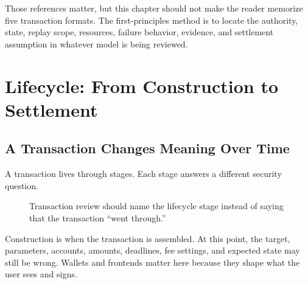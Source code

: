 Those references matter, but this chapter should not make the reader memorize five transaction formats. The first-principles method is to locate the authority, state, replay scope, resources, failure behavior, evidence, and settlement assumption in whatever model is being reviewed.

\section{Lifecycle: From Construction to Settlement}

\subsection{A Transaction Changes Meaning Over Time}

A transaction lives through stages. Each stage answers a different security question.

\begin{figure}[htbp]
\centering
{}
\caption{Transaction review should name the lifecycle stage instead of saying that the transaction ``went through.''}
\end{figure}

Construction is when the transaction is assembled. At this point, the target, parameters, accounts, amounts, deadlines, fee settings, and expected state may still be wrong. Wallets and frontends matter here because they shape what the user sees and signs.


